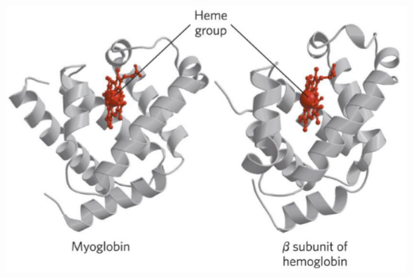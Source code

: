 \documentclass[10pt]{article}
\begin{document}
\begin{center}
    \includegraphics*[scale=0.5]{L1_18.png}
\end{center}
\end{document}
